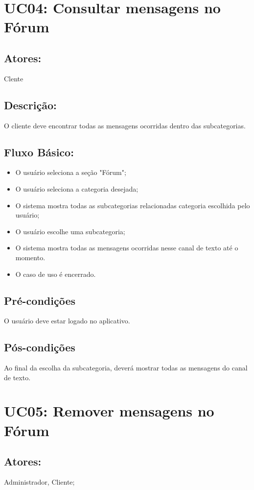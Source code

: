 \section{UC04: Consultar mensagens no Fórum}

\subsection{Atores:}
Clente
\subsection{Descrição:}
O cliente deve encontrar todas as mensagens ocorridas dentro das subcategorias.
\subsection{Fluxo Básico:}
\begin{itemize}
    \item O usuário seleciona a seção "Fórum";
    \item O usuário seleciona a categoria desejada;
    \item O sistema mostra todas as subcategorias relacionadas categoria escolhida pelo usuário;
    \item O usuário escolhe uma subcategoria;
    \item O sistema mostra todas as mensagens ocorridas nesse canal de texto até o momento. 
    \item O caso de uso é encerrado.
\end{itemize}

\subsection{Pré-condições}
O usuário deve estar logado no aplicativo. 
\subsection{Pós-condições}
Ao final da escolha da subcategoria, deverá mostrar todas as mensagens do canal de texto. 
\section{UC05: Remover mensagens no Fórum}

\subsection{Atores:}
Administrador, Cliente;
